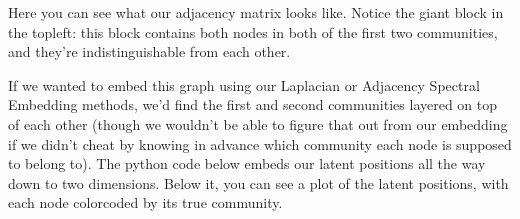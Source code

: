 \documentclass[letterpaper,10pt,english]{jupyterBook}
\begin{document}
\begin{sphinxVerbatim}[commandchars=\\\{\}]
   
   

    
      
    
  \PYG{p}{[}\PYG{p}{[}  \PYG{p}{]}
              \PYG{p}{[}  \PYG{p}{]}
              \PYG{p}{[}  \PYG{p}{]}\PYG{p}{]}  

   \PYG{p}{[}  \PYG{p}{]}    
\end{sphinxVerbatim}

\sphinxAtStartPar
Here you can see what our adjacency matrix looks like. Notice the giant block in the top\sphinxhyphen{}left: this block contains both nodes in both of the first two communities, and they’re indistinguishable from each other.

\noindent{}

\sphinxAtStartPar
If we wanted to embed this graph using our Laplacian or Adjacency Spectral Embedding methods, we’d find the first and second communities layered on top of each other (though we wouldn’t be able to figure that out from our embedding if we didn’t cheat by knowing in advance which community each node is supposed to belong to). The python code below embeds our latent positions all the way down to two dimensions. Below it, you can see a plot of the latent positions, with each node color\sphinxhyphen{}coded by its true community.
\end{document}
